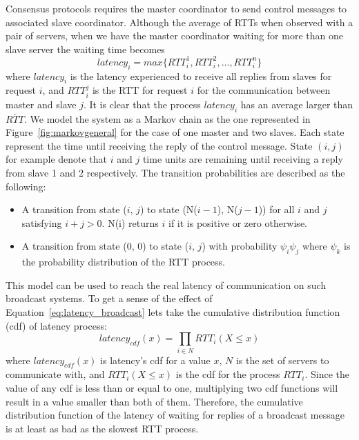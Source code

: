 Consensus protocols requires the master coordinator to send control messages to associated slave coordinator. Although the average of RTTs when observed with a pair of servers, when we have the master coordinator waiting for more than one slave server the waiting time becomes
\begin{equation}
\label{eq:latency_broadcast}
latency_i = max \{ RTT_i^1, RTT_i^2, \ldots, RTT_i^n \}
\end{equation}
where $latency_i$ is the latency experienced to receive all replies from slaves for request $i$, and $RTT_i^j$ is the RTT for request $i$ for the communication between master and slave $j$. It is clear that the process $latency_i$ has an average larger than $\bar{RTT}$. We model the system as a Markov chain as the one represented in Figure~\ref{fig:markovgeneral} for the case of one master and two slaves. Each state represent the time until receiving the reply of the control message. State $(i, j)$ for example denote that $i$ and $j$ time units are remaining until receiving a reply from slave 1 and 2 respectively. The transition probabilities are described as the following:
\begin{itemize}
\item{A transition from state ($i$, $j$) to state (N($i-1$), N($j-1$)) for all $i$ and $j$ satisfying $i + j > 0$. N(i) returns $i$ if it is positive or zero otherwise.}
\item{A transition from state (0, 0) to state ($i$, $j$) with probability $\psi_i\psi_j$ where $\psi_k$ is the probability distribution of the RTT process.} 
\end{itemize}
This model can be used to reach the real latency of communication on such broadcast systems. To get a sense of the effect of Equation~\ref{eq:latency_broadcast} lets take the cumulative distribution function (cdf) of latency process:
\begin{equation}
latency_{cdf}(x)  = \prod_{i \in N} RTT_i(X \leq x)
\end{equation}
where $latency_{cdf}(x)$ is latency's cdf for a value $x$, $N$ is the set of servers to communicate with, and $RTT_i(X \leq x)$ is the cdf for the process $RTT_i$. Since the value of any cdf is less than or equal to one, multiplying two cdf functions will result in a value smaller than both of them. Therefore, the cumulative distribution function of the latency of waiting for replies of a broadcast message is at least as bad as the slowest RTT process.

